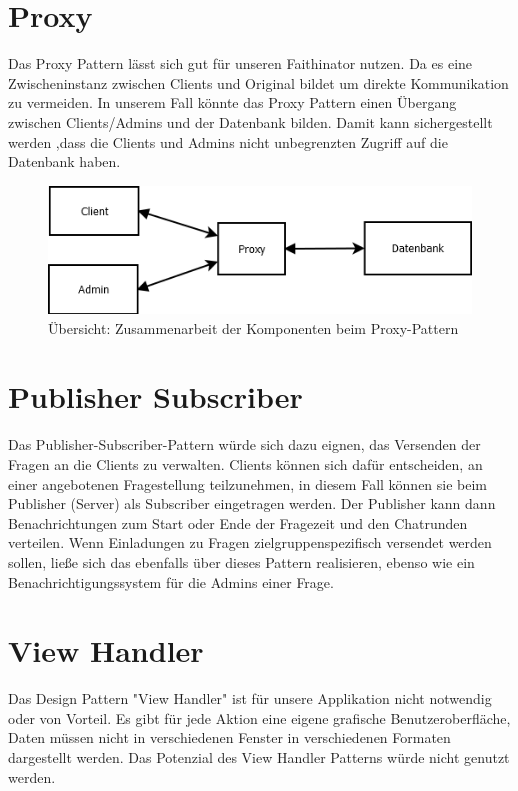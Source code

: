 \documentclass{scrreprt}
\begin{document}
\chapter{Proxy}
Das Proxy Pattern lässt sich gut für unseren Faithinator nutzen. Da es eine Zwischeninstanz zwischen Clients und Original bildet um direkte Kommunikation zu vermeiden. In unserem Fall könnte das Proxy Pattern einen Übergang zwischen Clients/Admins und der Datenbank bilden. Damit kann sichergestellt werden ,dass die Clients und Admins nicht unbegrenzten Zugriff auf die Datenbank haben.
\begin{figure}[ht]
 \includegraphics[width=\textwidth]{./pics/Proxy.png}
 \caption{Übersicht: Zusammenarbeit der Komponenten beim Proxy-Pattern}
 \label{abb:1}
\end{figure}

\chapter{Publisher Subscriber}
Das Publisher-Subscriber-Pattern würde sich dazu eignen, das Versenden der Fragen an die Clients zu verwalten. 
Clients können sich dafür entscheiden, an einer angebotenen Fragestellung teilzunehmen, in diesem Fall können sie beim Publisher (Server) als Subscriber eingetragen werden. Der Publisher kann dann Benachrichtungen zum Start oder Ende der Fragezeit und den Chatrunden verteilen.
Wenn Einladungen zu Fragen zielgruppenspezifisch versendet werden sollen, ließe sich das ebenfalls über dieses Pattern realisieren, ebenso wie ein Benachrichtigungssystem für die Admins einer Frage.

\chapter{View Handler}
Das Design Pattern "View Handler" ist für unsere Applikation nicht notwendig oder von Vorteil. Es gibt für jede Aktion eine eigene grafische Benutzeroberfläche, Daten müssen nicht in verschiedenen Fenster in verschiedenen Formaten dargestellt werden. Das Potenzial des View Handler Patterns würde nicht genutzt werden.
\end{document}
